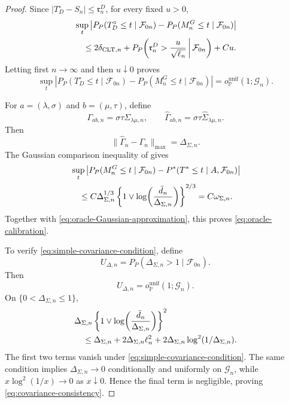 \documentclass[11pt]{article}
\theoremstyle{definition}
\newcommand{\1}{\mathbf 1}\newcommand{\op}{\operatorname}
\begin{document}
\begin{proof}
Since $|T_D^\circ-S_n|\le\mathfrak r_n^D$, for every fixed $u>0$,
\begin{align}
&\sup_t
\left|
P_P(T_D^\circ\le t\mid\mathcal F_{0n})
-
P_P(M_n^G\le t\mid\mathcal F_{0n})
\right|
\notag\\
&\quad\le
2\delta_{\mathrm{CLT},n}
+
P_P\!\left(
\mathfrak r_n^D>\frac{u}{\sqrt{\ell_n}}
\,\middle|\,
\mathcal F_{0n}
\right)
+
Cu.
\label{eq:linearization-sandwich}
\end{align}
Letting first $n\to\infty$ and then $u\downarrow0$ proves
\begin{equation}
\sup_t
\left|
P_P(T_D^\circ\le t\mid\mathcal F_{0n})
-
P_P(M_n^G\le t\mid\mathcal F_{0n})
\right|
=
o_{\mathbb P}^{\mathrm{unif}}(1;\mathcal G_n).
\label{eq:oracle-Gaussian-approximation}
\end{equation}

For $a=(\lambda,\sigma)$ and $b=(\mu,\tau)$, define
\[
\Gamma_{ab,n}=\sigma\tau\Sigma_{\lambda\mu,n},
\qquad
\widehat\Gamma_{ab,n}
=
\sigma\tau\widehat\Sigma_{\lambda\mu,n}.
\]
Then
\[
\|\widehat\Gamma_n-\Gamma_n\|_{\max}
=
\Delta_{\Sigma,n}.
\]
The Gaussian comparison inequality of
\citet{ChernozhukovChetverikovKato2015} gives
\begin{align}
&\sup_t
\left|
P_P(M_n^G\le t\mid\mathcal F_{0n})
-
P^*(T^*\le t\mid A,\mathcal F_{0n})
\right|
\notag\\
&\quad\le
C\Delta_{\Sigma,n}^{1/3}
\left\{
1\vee
\log\!\left(
\frac{\bar d_n}{\Delta_{\Sigma,n}}
\right)
\right\}^{2/3}
=
C\omega_{\Sigma,n}.
\label{eq:Gaussian-comparison}
\end{align}
Together with \eqref{eq:oracle-Gaussian-approximation}, this proves
\eqref{eq:oracle-calibration}.

To verify \eqref{eq:simple-covariance-condition}, define
\[
U_{\Delta,n}
=
P_P(\Delta_{\Sigma,n}>1\mid\mathcal F_{0n}).
\]
Then
\[
U_{\Delta,n}
=
o_{\mathbb P}^{\mathrm{unif}}(1;\mathcal G_n).
\]
On $\{0<\Delta_{\Sigma,n}\le1\}$,
\begin{align}
&\Delta_{\Sigma,n}
\left\{
1\vee
\log\!\left(
\frac{\bar d_n}{\Delta_{\Sigma,n}}
\right)
\right\}^{2}
\notag\\
&\quad\le
\Delta_{\Sigma,n}
+
2\Delta_{\Sigma,n}\ell_n^2
+
2\Delta_{\Sigma,n}\log^2(1/\Delta_{\Sigma,n}).
\label{eq:simple-covariance-implication}
\end{align}
The first two terms vanish under
\eqref{eq:simple-covariance-condition}. The same condition implies
$\Delta_{\Sigma,n}\to0$ conditionally and uniformly on $\mathcal G_n$,
while $x\log^2(1/x)\to0$ as $x\downarrow0$. Hence the final term is
negligible, proving \eqref{eq:covariance-consistency}.


\end{proof}
\end{document}
